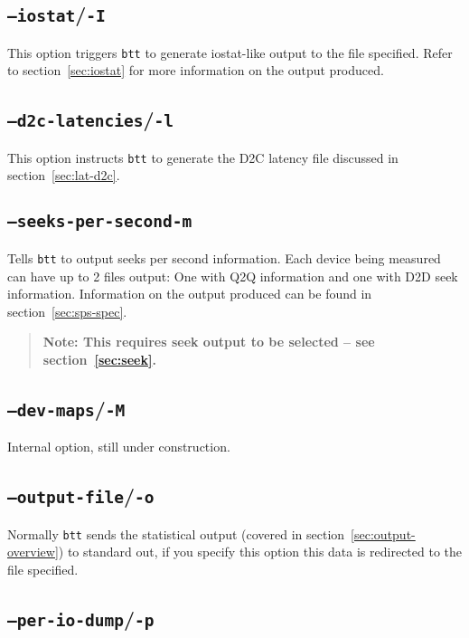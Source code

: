 \documentclass{article}
\begin{document}
\subsection{\label{sec:o-I}\texttt{--iostat}/\texttt{-I}}

  This option triggers \texttt{btt} to generate iostat-like output to the
  file specified. Refer to section~\ref{sec:iostat} for more information
  on the output produced.

\subsection{\label{sec:o-l}\texttt{--d2c-latencies}/\texttt{-l}}

  This option instructs \texttt{btt} to generate the D2C latency file
  discussed in section~\ref{sec:lat-d2c}.

\subsection{\label{sec:o-m}\texttt{--seeks-per-second}\texttt{-m}}

  Tells \texttt{btt} to output seeks per second information.  Each device
  being measured can have up to 2 files output: One with Q2Q information
  and one with D2D seek information. Information on the output produced
  can be found in section~\ref{sec:sps-spec}.

  \begin{quote}
    \textbf{Note: This requires seek output to be selected -- see
    section~\ref{sec:seek}.}
  \end{quote}

\subsection{\label{sec:o-M}\texttt{--dev-maps}/\texttt{-M}}

  Internal option, still under construction.

\subsection{\label{sec:o-o}\texttt{--output-file}/\texttt{-o}}

  Normally \texttt{btt} sends the statistical output (covered in
  section~\ref{sec:output-overview}) to standard out, if you specify
  this option this data is redirected to the file specified.

\subsection{\label{sec:o-p}\texttt{--per-io-dump}/\texttt{-p}}
\end{document}
